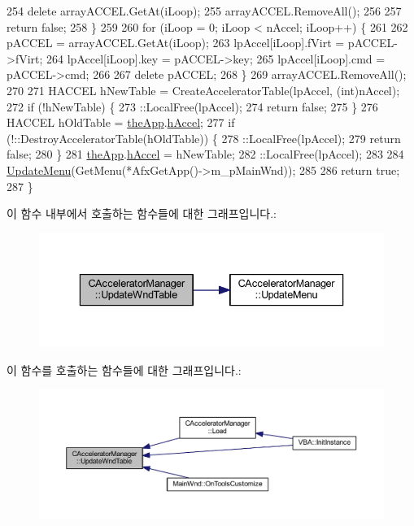 \begin{DoxyCode}
254       \textcolor{keyword}{delete} arrayACCEL.GetAt(iLoop);
255     arrayACCEL.RemoveAll();
256 
257     \textcolor{keywordflow}{return} \textcolor{keyword}{false};
258   \}
259 
260   \textcolor{keywordflow}{for} (iLoop = 0; iLoop < nAccel; iLoop++) \{
261     
262     pACCEL = arrayACCEL.GetAt(iLoop);
263     lpAccel[iLoop].fVirt = pACCEL->fVirt;
264     lpAccel[iLoop].key = pACCEL->key;
265     lpAccel[iLoop].cmd = pACCEL->cmd;
266 
267     \textcolor{keyword}{delete} pACCEL;
268   \}
269   arrayACCEL.RemoveAll();
270 
271   HACCEL hNewTable = CreateAcceleratorTable(lpAccel, (\textcolor{keywordtype}{int})nAccel);
272   \textcolor{keywordflow}{if} (!hNewTable) \{
273     ::LocalFree(lpAccel);
274     \textcolor{keywordflow}{return} \textcolor{keyword}{false};
275   \}
276   HACCEL hOldTable = \mbox{\hyperlink{_v_b_a_8cpp_a8095a9d06b37a7efe3723f3218ad8fb3}{theApp}}.\mbox{\hyperlink{class_v_b_a_a6ca8052bfc1574a9ef8ca4482563e1e3}{hAccel}};
277   \textcolor{keywordflow}{if} (!::DestroyAcceleratorTable(hOldTable)) \{
278     ::LocalFree(lpAccel);
279     \textcolor{keywordflow}{return} \textcolor{keyword}{false};
280   \}
281   \mbox{\hyperlink{_v_b_a_8cpp_a8095a9d06b37a7efe3723f3218ad8fb3}{theApp}}.\mbox{\hyperlink{class_v_b_a_a6ca8052bfc1574a9ef8ca4482563e1e3}{hAccel}} = hNewTable;
282   ::LocalFree(lpAccel);
283 
284   \mbox{\hyperlink{class_c_accelerator_manager_ac854ec5263a7bab961bf63aec3938984}{UpdateMenu}}(GetMenu(*AfxGetApp()->m\_pMainWnd));
285 
286   \textcolor{keywordflow}{return} \textcolor{keyword}{true};
287 \}
\end{DoxyCode}
이 함수 내부에서 호출하는 함수들에 대한 그래프입니다.\+:
\nopagebreak
\begin{figure}[H]
\begin{center}
\leavevmode
\includegraphics[width=336pt]{class_c_accelerator_manager_a3fa9c8e4f44acc76cc40fc7382e597d8_cgraph}
\end{center}
\end{figure}
이 함수를 호출하는 함수들에 대한 그래프입니다.\+:
\nopagebreak
\begin{figure}[H]
\begin{center}
\leavevmode
\includegraphics[width=350pt]{class_c_accelerator_manager_a3fa9c8e4f44acc76cc40fc7382e597d8_icgraph}
\end{center}
\end{figure}
